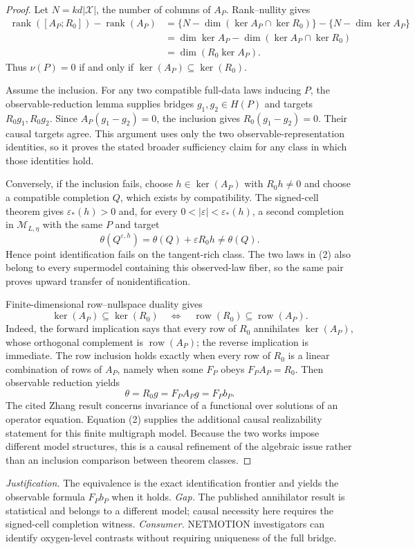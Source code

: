 \documentclass{article}
\begin{document}
\begin{proof}
Let \(N=kd|\mathcal X|\), the number of columns of \(A_P\).  Rank--nullity gives
\[
\begin{aligned}
\operatorname{rank}([A_P;R_0])-\operatorname{rank}(A_P)
&=\{N-\dim(\ker A_P\cap\ker R_0)\}-\{N-\dim\ker A_P\}\\
&=\dim\ker A_P-\dim(\ker A_P\cap\ker R_0)\\
&=\dim(R_0\ker A_P).
\end{aligned}
\tag{1}
\]
Thus \(\nu(P)=0\) if and only if \(\ker(A_P)\subseteq\ker(R_0)\).

Assume the inclusion.  For any two compatible full-data laws inducing \(P\), the observable-reduction lemma supplies bridges \(g_1,g_2\in H(P)\) and targets \(R_0g_1,R_0g_2\).  Since \(A_P(g_1-g_2)=0\), the inclusion gives \(R_0(g_1-g_2)=0\).  Their causal targets agree.  This argument uses only the two observable-representation identities, so it proves the stated broader sufficiency claim for any class in which those identities hold.

Conversely, if the inclusion fails, choose \(h\in\ker(A_P)\) with \(R_0h\ne0\) and choose a compatible completion \(Q\), which exists by compatibility.  The signed-cell theorem gives \(\varepsilon_*(h)>0\) and, for every \(0<|\varepsilon|<\varepsilon_*(h)\), a second completion in \(\mathcal M_{L,\eta}\) with the same \(P\) and target
\[
\theta(Q^{\varepsilon,h})=\theta(Q)+\varepsilon R_0h\ne\theta(Q).
\tag{2}
\]
Hence point identification fails on the tangent-rich class.  The two laws in (2) also belong to every supermodel containing this observed-law fiber, so the same pair proves upward transfer of nonidentification.

Finite-dimensional row--nullspace duality gives
\[
\ker(A_P)\subseteq\ker(R_0)
\quad\Longleftrightarrow\quad
\operatorname{row}(R_0)\subseteq\operatorname{row}(A_P).
\tag{3}
\]
Indeed, the forward implication says that every row of \(R_0\) annihilates \(\ker(A_P)\), whose orthogonal complement is \(\operatorname{row}(A_P)\); the reverse implication is immediate.  The row inclusion holds exactly when every row of \(R_0\) is a linear combination of rows of \(A_P\), namely when some \(F_P\) obeys \(F_PA_P=R_0\).  Then observable reduction yields
\[
\theta=R_0g=F_PA_Pg=F_Pb_P.
\tag{4}
\]
The cited Zhang result concerns invariance of a functional over solutions of an operator equation.  Equation (2) supplies the additional causal realizability statement for this finite multigraph model.  Because the two works impose different model structures, this is a causal refinement of the algebraic issue rather than an inclusion comparison between theorem classes.
\end{proof}
\par\smallskip\noindent \textit{Justification.} The equivalence is the exact identification frontier and yields the observable formula \(F_Pb_P\) when it holds. \textit{Gap.} The published annihilator result is statistical and belongs to a different model; causal necessity here requires the signed-cell completion witness. \textit{Consumer.} NETMOTION investigators can identify oxygen-level contrasts without requiring uniqueness of the full bridge.
\end{document}
